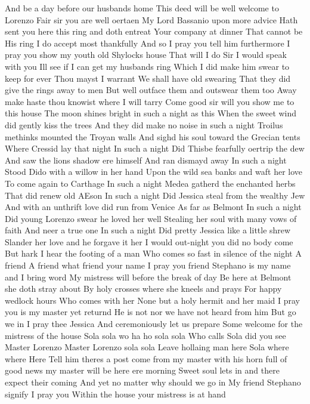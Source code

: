 And be a day before our husbands home
This deed will be well welcome to Lorenzo
Fair sir you are well oertaen
My Lord Bassanio upon more advice
Hath sent you here this ring and doth entreat
Your company at dinner
That cannot be
His ring I do accept most thankfully
And so I pray you tell him furthermore
I pray you show my youth old Shylocks house
That will I do
Sir I would speak with you
Ill see if I can get my husbands ring
Which I did make him swear to keep for ever
Thou mayst I warrant
We shall have old swearing
That they did give the rings away to men
But well outface them and outswear them too
Away make haste thou knowist where I will tarry
Come good sir will you show me to this house
The moon shines bright in such a night as this
When the sweet wind did gently kiss the trees
And they did make no noise in such a night
Troilus methinks mounted the Troyan walls
And sighd his soul toward the Grecian tents
Where Cressid lay that night
In such a night
Did Thisbe fearfully oertrip the dew
And saw the lions shadow ere himself
And ran dismayd away
In such a night
Stood Dido with a willow in her hand
Upon the wild sea banks and waft her love
To come again to Carthage
In such a night
Medea gatherd the enchanted herbs
That did renew old AEson
In such a night
Did Jessica steal from the wealthy Jew
And with an unthrift love did run from Venice
As far as Belmont
In such a night
Did young Lorenzo swear he loved her well
Stealing her soul with many vows of faith
And neer a true one
In such a night
Did pretty Jessica like a little shrew
Slander her love and he forgave it her
I would out-night you did no body come
But hark I hear the footing of a man
Who comes so fast in silence of the night
A friend
A friend what friend your name I pray you friend
Stephano is my name and I bring word
My mistress will before the break of day
Be here at Belmont she doth stray about
By holy crosses where she kneels and prays
For happy wedlock hours
Who comes with her
None but a holy hermit and her maid
I pray you is my master yet returnd
He is not nor we have not heard from him
But go we in I pray thee Jessica
And ceremoniously let us prepare
Some welcome for the mistress of the house
Sola sola wo ha ho sola sola
Who calls
Sola did you see Master Lorenzo
Master Lorenzo sola sola
Leave hollaing man here
Sola where where
Here
Tell him theres a post come from my master with
his horn full of good news my master will be here
ere morning
Sweet soul lets in and there expect their coming
And yet no matter why should we go in
My friend Stephano signify I pray you
Within the house your mistress is at hand
